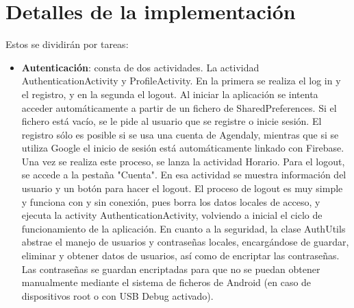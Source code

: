 \documentclass[a4paper,openright,12pt]{article}
\begin{document}
\section{Detalles de la implementación}
Estos se dividirán por tareas:
\begin{itemize}
    \item \textbf{Autenticación}: consta de dos actividades. La actividad AuthenticationActivity y ProfileActivity. En la primera se realiza el log in y el registro, y en la segunda el logout. Al iniciar la aplicación se intenta acceder automáticamente a partir de un fichero de SharedPreferences. Si el fichero está vacío, se le pide al usuario que se registre o inicie sesión. El registro sólo es posible si se usa una cuenta de Agendaly, mientras que si se utiliza Google el inicio de sesión está automáticamente linkado con Firebase. Una vez se realiza este proceso, se lanza la actividad Horario. 
    \newline
    Para el logout, se accede a la pestaña "Cuenta". En esa actividad se muestra información del usuario y un botón para hacer el logout. El proceso de logout es muy simple y funciona con y sin conexión, pues borra los datos locales de acceso, y ejecuta la activity AuthenticationActivity, volviendo a inicial el ciclo de funcionamiento de la aplicación.
    \newline
    En cuanto a la seguridad, la clase AuthUtils abstrae el manejo de usuarios y contraseñas locales, encargándose de guardar, eliminar y obtener datos de usuarios, así como de encriptar las contraseñas. Las contraseñas se guardan encriptadas para que no se puedan obtener manualmente mediante el sistema de ficheros de Android (en caso de dispositivos root o con USB Debug activado).
        
\end{itemize}
\end{document}
